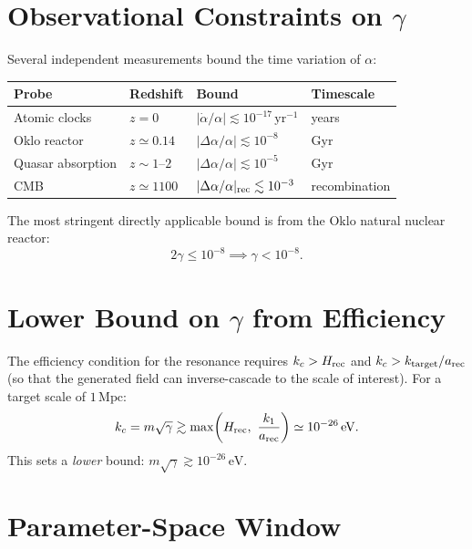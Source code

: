 \documentclass[12pt,a4paper,openany]{book}
\newcommand{\kc}{k_c}
\begin{document}
\section{Observational Constraints on $\gamma$}

Several independent measurements bound the time variation of $\alpha$:

\begin{center}
\begin{tabular}{llll}
\toprule
\textbf{Probe} & \textbf{Redshift} & \textbf{Bound} & \textbf{Timescale} \\
\midrule
Atomic clocks & $z=0$ & $|\dot\alpha/\alpha| \lesssim 10^{-17}\,\mathrm{yr}^{-1}$ & years \\
Oklo reactor & $z \simeq 0.14$ & $|\Delta\alpha/\alpha| \lesssim 10^{-8}$ & Gyr \\
Quasar absorption & $z \sim 1$--$2$ & $|\Delta\alpha/\alpha| \lesssim 10^{-5}$ & Gyr \\
CMB & $z \simeq 1100$ & $|\Delta\alpha/\alpha|_{\rm rec} \lesssim 10^{-3}$ & recombination \\
\bottomrule
\end{tabular}
\end{center}

The most stringent directly applicable bound is from the Oklo natural nuclear reactor:
\begin{equation}
  2\gamma \leq 10^{-8} \implies \gamma < 10^{-8}.
  \label{eq:gamma_bound}
\end{equation}

\section{Lower Bound on $\gamma$ from Efficiency}

The efficiency condition for the resonance requires $\kc > H_{\rm rec}$ and $\kc > k_{\rm target}/a_{\rm rec}$ (so that the generated field can inverse-cascade to the scale of interest). For a target scale of $1\,\mathrm{Mpc}$:
\begin{equation}
  \kc = m\sqrt{\gamma} \gtrsim \max\!\left(H_{\rm rec},\ \frac{k_1}{a_{\rm rec}}\right) \simeq 10^{-26}\,\mathrm{eV}.
  \label{eq:gamma_lower}
\end{equation}
This sets a \emph{lower} bound: $m\sqrt{\gamma} \gtrsim 10^{-26}\,\mathrm{eV}$.

\section{Parameter-Space Window}
\end{document}
